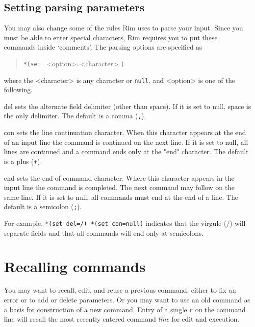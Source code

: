 \documentclass[11pt,a4paper]{report}
\begin{document}
\subsection{Setting parsing parameters}
%
\label{cmt-cmd}
You may also change some of the rules Rim uses to parse your
input.  Since you must be able to enter special characters,
Rim requires you to put these commands inside `comments'.
The parsing options are specified as
\begin{verse}
\verb!*(set ! <option>\verb!=!<character> \verb!)!
\end{verse}
where the <character> is any character or \verb!null!,
and <option> is one of the following.
\begin{List}
\item[del] sets the alternate field delimiter (other than space).
           If it is set to null, space is the only delimiter.
           The default is a comma (\verb!,!).
 
\item[con] 
           sets the line continuation character.  When this character
           appears at the end of an input line the command
           is continued on the next line.
           If it is set to null, all lines are continued and
           a command ends only at the "end" character.
           The default is a plus (\verb!+!).
\item[end] sets the end of command character.  Where this character
           appears in the input line the command is completed.
           The next command may follow on the same line.
           If it is set to null, all commands must end at the
           end of a line.
           The default is a semicolon (\verb!;!).
\end{List}
For example, \verb!*(set del=/) *(set con=null)!
indicates that the virgule (/) will separate fields and that all
commands will end only at semicolons.
 
 
\section{Recalling commands}
%
You may want to recall, edit, and reuse a previous command,
either to fix an error or to add or delete parameters.
Or you may want to use an old command as a basis for
construction of a new command.  Entry of a single
\verb!r!
on the command line will recall the most recently entered
command {\em line} for edit and execution.
 
\end{document}

